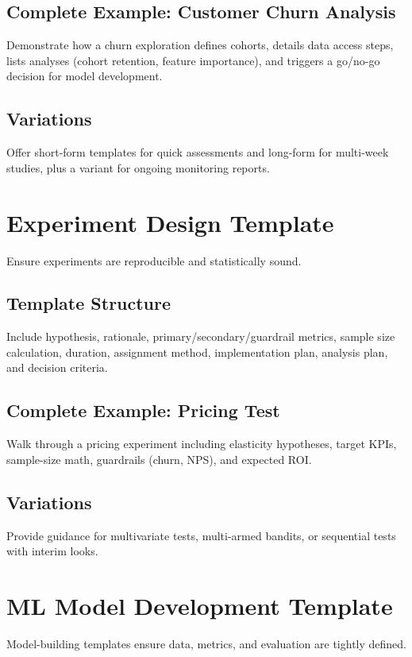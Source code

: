 \subsection{Complete Example: Customer Churn Analysis}
Demonstrate how a churn exploration defines cohorts, details data access steps, lists analyses (cohort retention, feature importance), and triggers a go/no-go decision for model development.

\subsection{Variations}
Offer short-form templates for quick assessments and long-form for multi-week studies, plus a variant for ongoing monitoring reports.

\section{Experiment Design Template}
\label{sec:experiment-template}

Ensure experiments are reproducible and statistically sound.

\subsection{Template Structure}
Include hypothesis, rationale, primary/secondary/guardrail metrics, sample size calculation, duration, assignment method, implementation plan, analysis plan, and decision criteria.

\subsection{Complete Example: Pricing Test}
Walk through a pricing experiment including elasticity hypotheses, target KPIs, sample-size math, guardrails (churn, NPS), and expected ROI.

\subsection{Variations}
Provide guidance for multivariate tests, multi-armed bandits, or sequential tests with interim looks.

\section{ML Model Development Template}
\label{sec:ml-model-template}

Model-building templates ensure data, metrics, and evaluation are tightly defined.

